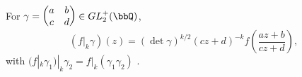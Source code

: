 For $\gamma=\begin{pmatrix}a&b\\c&d\end{pmatrix}\in GL_2^+(\bbQ)$,
\[
(f|_k\gamma)(z)=(\det\gamma)^{k/2}(cz+d)^{-k}f\!\left(\frac{az+b}{cz+d}\right),
\]
with $(f|_k\gamma_1)|_k\gamma_2=f|_k(\gamma_1\gamma_2)$ \cite[p.~9]{PrasadNotes}.

